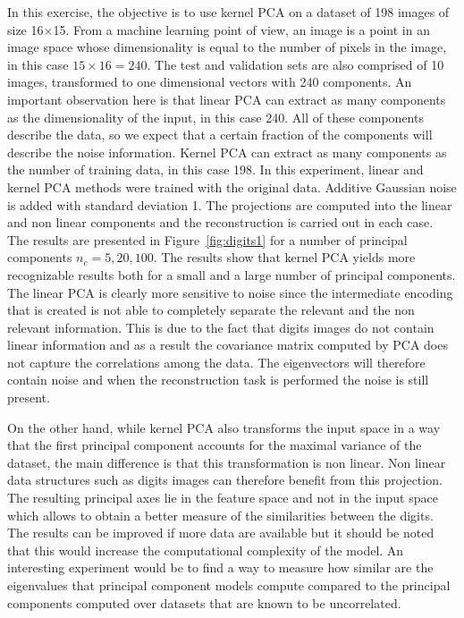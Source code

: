 \documentclass[conference,compsoc]{IEEEtran}
\begin{document}
In this exercise, the objective is to use kernel PCA on a dataset of 198 images of size 16$\times$15. From a machine learning point of view, an image is a point in an image space whose dimensionality is
equal to the number of pixels in the image, in this case $15 \times 16 =240$. The test and validation sets are also comprised of 10 images, transformed to one dimensional vectors with 240 components. An important observation here is that linear PCA can extract as many components as the dimensionality of the input, in this case 240. All of these components describe the data, so we expect that a certain fraction of the components will describe the noise information. Kernel PCA can extract as many components as the number of training data, in this case 198. In this experiment, linear and kernel PCA methods were trained with the original data. Additive Gaussian noise is added with standard deviation 1. The projections are computed into the linear and non linear components and the reconstruction is carried out in each case. The results are presented in Figure~\ref{fig:digits1} for a number of principal components $n_c=5,20,100$. The results show that kernel PCA yields more recognizable results both for a small and a large number of principal components. The linear PCA is clearly more sensitive to noise since the intermediate encoding that is created is not able to completely separate the relevant and the non relevant information. This is due to the fact that digits images do not contain linear information and as a result the covariance matrix computed by PCA does not capture the correlations among the data. The eigenvectors will therefore contain noise and when the reconstruction task is performed the noise is still present. 

On the other hand, while kernel PCA also transforms the input space in a way that the first principal component accounts for the maximal variance of the dataset, the main difference is that this transformation is non linear. Non linear data structures such as digits images can therefore benefit from this projection. The resulting principal axes lie in the feature space and not in the input space which allows to obtain a better measure of the similarities between the digits. The results can be improved if more data are available but it should be noted that this would increase the computational complexity of the model. An interesting experiment would be to find a way to measure how similar are the eigenvalues that principal component models compute compared to the principal components computed over datasets that are known to be uncorrelated. 
\end{document}
